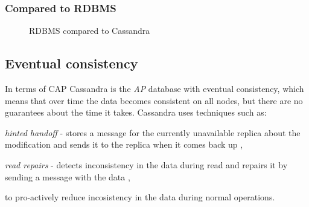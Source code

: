 \subsubsection{Compared to RDBMS}
\begin{figure}[hbt]
  \setlength{\unitlength}{1.3cm}  
  \caption{RDBMS compared to Cassandra}
  \label{fig:cassandraToRdbms}
\end{figure}

\subsection{Eventual consistency}\label{sec:theory:eventualConsistency}
In terms of CAP \cite{brewer2000towards} \cite{Brewer:2012ba} Cassandra is the \emph{AP} database with eventual consistency, which means that over time the data becomes consistent on all nodes, but there are no guarantees about the time it takes. Cassandra uses techniques such as: \begin{enumerate*} 
\item \emph{hinted handoff} - stores a message for the currently unavailable replica about the modification and sends it to the replica when it comes back up \cite{CassandraHintedHandoff},  
\item \emph{read repairs} - detects inconsistency in the data during read and repairs it by sending a message with the data \cite{CassandraReadRepair},  \end{enumerate*} to pro-actively reduce incosistency in the data during normal operations.